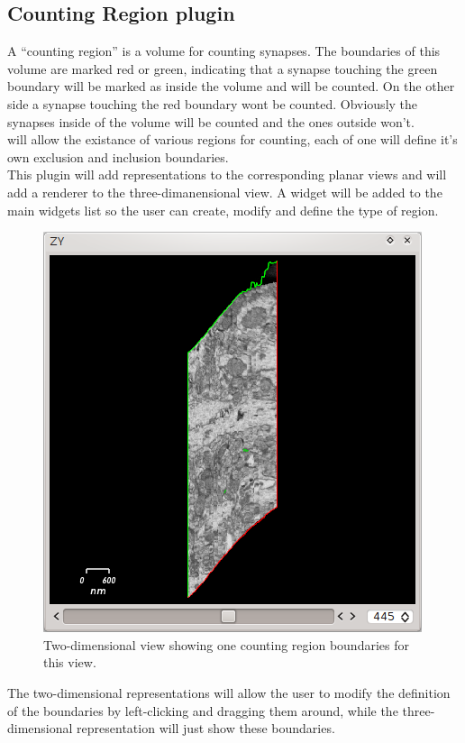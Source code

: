 \subsection{Counting Region plugin}

A ``counting region'' is a volume for counting synapses. The boundaries of this
volume are marked red or green, indicating that a synapse touching the green boundary
will be marked as inside the volume and will be counted. On the other side a synapse
touching the red boundary wont be counted. Obviously the synapses inside of the volume
will be counted and the ones outside won't.\\
\espina{} will allow the existance of various regions for counting, each of one will
define it's own exclusion and inclusion boundaries.\\
This plugin will add representations to the corresponding planar views and will add a 
renderer to the three-dimanensional view. A widget will be added to the main widgets list 
so the user can create, modify and define the type of region.\\

\begin{figure}[H]
\centering
\includegraphics[scale=0.5]{fig/plugin-ct-2Dwidget.png}
\caption{Two-dimensional view showing one counting region boundaries for this view.}
\end{figure}

The two-dimensional representations will allow the user to modify the definition of the
boundaries by left-clicking and dragging them around, while the three-dimensional
representation will just show these boundaries.\\

